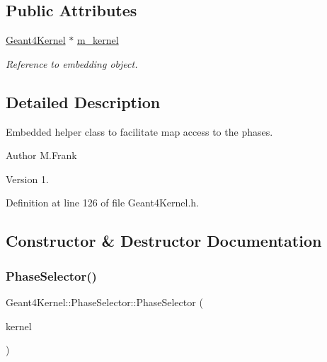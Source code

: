\subsection*{Public Attributes}
\begin{DoxyCompactItemize}
\item 
\hyperlink{class_d_d4hep_1_1_simulation_1_1_geant4_kernel}{Geant4\+Kernel} $\ast$ \hyperlink{class_d_d4hep_1_1_simulation_1_1_geant4_kernel_1_1_phase_selector_a8f91fcbd0cf2877738f2e227a697d88c}{m\+\_\+kernel}
\begin{DoxyCompactList}\small\item\em Reference to embedding object. \end{DoxyCompactList}\end{DoxyCompactItemize}


\subsection{Detailed Description}
Embedded helper class to facilitate map access to the phases. 

\begin{DoxyAuthor}{Author}
M.\+Frank 
\end{DoxyAuthor}
\begin{DoxyVersion}{Version}
1. 
\end{DoxyVersion}


Definition at line 126 of file Geant4\+Kernel.\+h.



\subsection{Constructor \& Destructor Documentation}
\hypertarget{class_d_d4hep_1_1_simulation_1_1_geant4_kernel_1_1_phase_selector_a3a641f53e3730efcff6eba4a42d509d1}{}\label{class_d_d4hep_1_1_simulation_1_1_geant4_kernel_1_1_phase_selector_a3a641f53e3730efcff6eba4a42d509d1} 
\subsubsection{\texorpdfstring{Phase\+Selector()}{PhaseSelector()}\hspace{0.1cm}{\footnotesize\ttfamily [1/2]}}
{\footnotesize\ttfamily Geant4\+Kernel\+::\+Phase\+Selector\+::\+Phase\+Selector (\begin{DoxyParamCaption}\item[{\hyperlink{class_d_d4hep_1_1_simulation_1_1_geant4_kernel}{Geant4\+Kernel} $\ast$}]{kernel }\end{DoxyParamCaption})}



